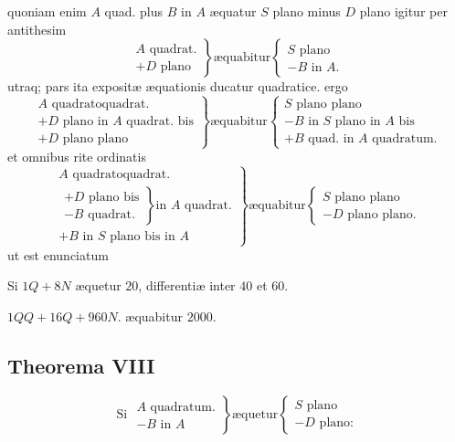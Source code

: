 \documentclass[11pt,a4paper]{article}
\begin{document}
quoniam enim $A$ quad. plus $B$ in $A$ æquatur $S$ plano minus $D$ plano igitur per antithesim
\[ \left.\begin{array}{l} A \text{ quadrat.} \\ + D \text{ plano} \end{array}\right\} \text{æquabitur} \left\{\begin{array}{l} S \text{ plano} \\ - B \text{ in } A. \end{array}\right. \]
utraq; pars ita expositæ æquationis ducatur quadratice. ergo
\[ \left.\begin{array}{l} A \text{ quadratoquadrat.} \\ + D \text{ plano in } A \text{ quadrat. bis} \\ + D \text{ plano plano} \end{array}\right\} \text{æquabitur} \left\{\begin{array}{l} S \text{ plano plano} \\ - B \text{ in } S \text{ plano in } A \text{ bis} \\ + B \text{ quad. in } A \text{ quadratum.} \end{array}\right. \]
et omnibus rite ordinatis
\[ \left.\begin{array}{l} A \text{ quadratoquadrat.} \\ \left.\begin{array}{l} + D \text{ plano bis} \\ - B \text{ quadrat.} \end{array}\right\} \text{in } A \text{ quadrat.} \\ + B \text{ in } S \text{ plano bis in } A \end{array}\right\} \text{æquabitur} \left\{\begin{array}{l} S \text{ plano plano} \\ - D \text{ plano plano.} \end{array}\right. \]
ut est enunciatum

Si $1Q + 8N$ æquetur $20$, differentiæ inter $40$ et $60$.

$1QQ + 16Q + 960N$. æquabitur $2000$.


\subsection*{Theorema VIII}

\[ \text{Si } \left.\begin{array}{l} A \text{ quadratum.} \\ - B \text{ in } A \end{array}\right\} \text{æquetur} \left\{\begin{array}{l} S \text{ plano} \\ - D \text{ plano:} \end{array}\right. \]
\end{document}
